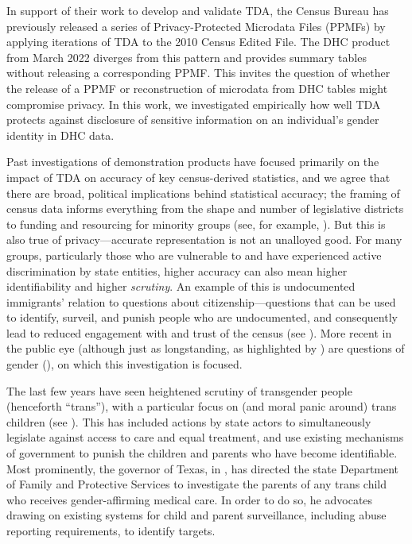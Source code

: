 \documentclass{jpc} %
\theoremstyle{plain}\newtheorem{satz}[thm]{Satz} %
\begin{document}
In support of their work to develop and validate TDA,  the Census Bureau has previously released a series of Privacy-Protected Microdata Files (PPMFs) by applying iterations of TDA to the 2010 Census Edited File.  The DHC product from March 2022 diverges from this pattern and provides summary tables without releasing a corresponding PPMF.  This invites the question of whether the release of a PPMF or reconstruction of microdata from DHC tables might compromise privacy.  In this work, we investigated empirically how well TDA protects against disclosure of sensitive information on an individual's gender identity in DHC data.

Past investigations of demonstration products have focused primarily on the impact of TDA on accuracy of key census-derived statistics,
and we agree that there are broad, political implications behind statistical accuracy; the framing of census data informs everything from the shape and number of legislative districts to funding and resourcing for minority groups (see, for example, \cite{thompson2012making}). But this is also true of privacy---accurate representation is not an unalloyed good. For many groups, particularly those who are vulnerable to and have experienced active discrimination by state entities, higher accuracy can also mean higher identifiability and higher \textit{scrutiny}. An example of this is undocumented immigrants' relation to questions about citizenship---questions that can be used to identify, surveil, and punish people who are undocumented, and consequently lead to reduced engagement with and trust of the census (see \cite{barreto2019}). More recent in the public eye (although just as longstanding, as highlighted by \cite{canaday2009straight}) are questions of gender (\cite{singer2015profusion}), on which this investigation is focused.

The last few years have seen heightened scrutiny of transgender people (henceforth ``trans''), with a particular focus on (and moral panic around) trans children (see \cite{slothouber2020trans}). This has included actions by state actors to simultaneously legislate against access to care and equal treatment, and use existing mechanisms of government to punish the children and parents who have become identifiable. Most prominently, the governor of Texas, in \cite{abbottletter}, has directed the state Department of Family and Protective Services to investigate the parents of any trans child who receives gender-affirming medical care. In order to do so, he advocates drawing on existing systems for child and parent surveillance, including abuse reporting requirements, to identify targets.
\end{document}
